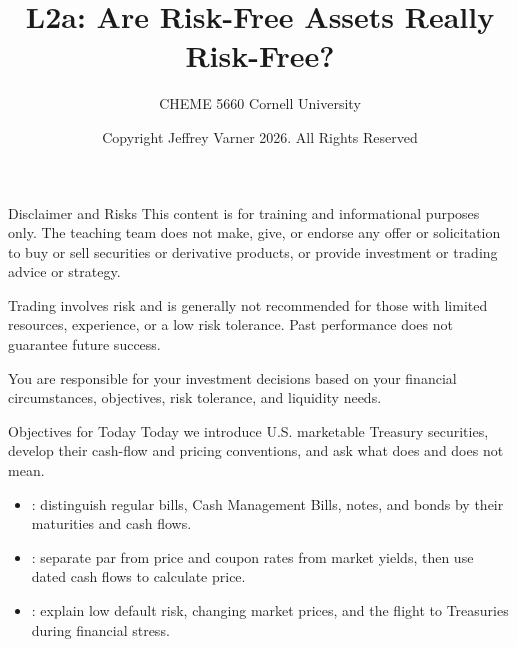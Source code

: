 \documentclass[aspectratio=169,11pt]{beamer}
\title{{\vnheavy L2a}: Are Risk-Free Assets Really Risk-Free?}
\subtitle{CHEME 5660 Cornell University}
\author{Copyright Jeffrey Varner 2026. All Rights Reserved}
\begin{document}
\vntitlepage

\begin{frame}{Disclaimer and Risks}
  \vspace{0.6em}
  \textbf{} This content is for training and informational
  purposes only. The teaching team does not make, give, or endorse any offer or
  solicitation to buy or sell securities or derivative products, or provide
  investment or trading advice or strategy.

  \vspace{1.1em}
  \textbf{} Trading involves risk and is generally not recommended for
  those with limited resources, experience, or a low risk tolerance. Past
  performance does not guarantee future success.

  \vspace{1.1em}
  \textbf{} You are responsible for your investment decisions
  based on your financial circumstances, objectives, risk tolerance, and
  liquidity needs.
\end{frame}

\begin{frame}{Objectives for Today}
  \vspace{0.4em}
  Today we introduce U.S. marketable Treasury securities, develop their cash-flow
  and pricing conventions, and ask what  does and does not mean.

  \vspace{0.9em}
  {\large\textbf{}}
  \vspace{0.4em}
  \begin{itemize}\setlength{\itemsep}{0.5em}
    \item {}: distinguish regular bills, Cash
      Management Bills, notes, and bonds by their maturities and cash flows.
    \item {}: separate par from price and coupon
      rates from market yields, then use dated cash flows to calculate price.
    \item {}: explain low default risk,
      changing market prices, and the flight to Treasuries during financial stress.
  \end{itemize}
  \vspace{-0.4em}

\end{frame}
\end{document}
